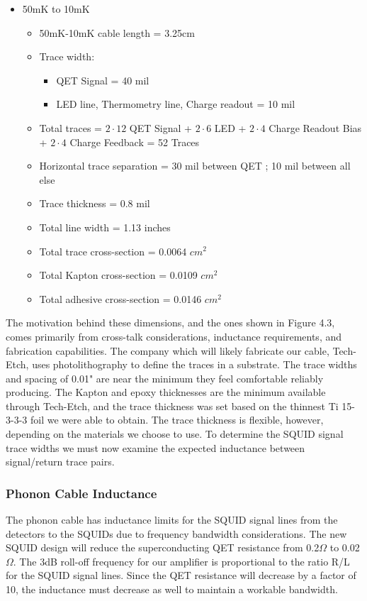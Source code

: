 \documentclass{report}
\begin{document}
\begin{itemize}
\item 50mK to 10mK
    \begin{itemize}
    \item 50mK-10mK cable length = 3.25cm
    \item Trace width:
        \begin{itemize}
        \item QET Signal = 40 mil
        \item LED line, Thermometry line, Charge readout = 10 mil
        \end{itemize}
    \item Total traces = $2\cdot12$ QET Signal + $2\cdot6$ LED + $2\cdot4$ Charge Readout Bias + $2\cdot4$ Charge Feedback = 52 Traces
    \item Horizontal trace separation = 30 mil between QET ; 10 mil between all else
    \item Trace thickness = 0.8 mil
    \item Total line width = 1.13 inches
    \item Total trace cross-section = 0.0064 $cm^2$
    \item Total Kapton cross-section = 0.0109 $cm^2$
    \item Total adhesive cross-section = 0.0146 $cm^2$
    \end{itemize}
\end{itemize}

The motivation behind these dimensions, and the ones shown in Figure 4.3, comes primarily from cross-talk considerations, inductance requirements, and fabrication capabilities. The company which will likely fabricate our cable, Tech-Etch, uses photolithography to define the traces in a substrate. The trace widths and spacing of 0.01" are near the minimum they feel comfortable reliably producing. The Kapton and epoxy thicknesses are the minimum available through Tech-Etch, and the trace thickness was set based on the thinnest Ti 15-3-3-3 foil we were able to obtain. The trace thickness is flexible, however, depending on the materials we choose to use. To determine the SQUID signal trace widths we must now examine the expected inductance between signal/return trace pairs.

\subsubsection{Phonon Cable Inductance}

The phonon cable has inductance limits for the SQUID signal lines from the detectors to the SQUIDs due to frequency bandwidth considerations. The new SQUID design will reduce the superconducting QET resistance from 0.2$\Omega$ to 0.02$\Omega$. The 3dB roll-off frequency for our amplifier is proportional to the ratio R/L for the SQUID signal lines. Since the QET resistance will decrease by a factor of 10, the inductance must decrease as well to maintain a workable bandwidth.
\end{document}
